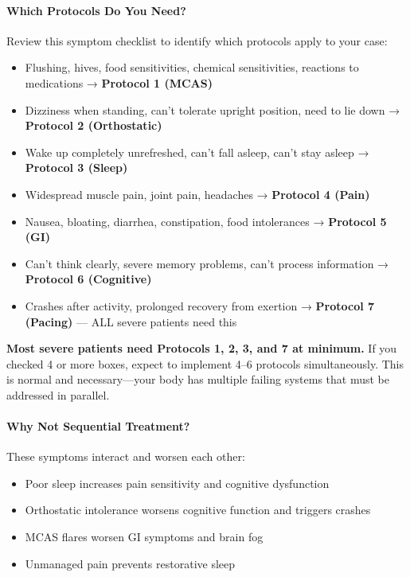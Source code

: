 \paragraph{Which Protocols Do You Need?}

Review this symptom checklist to identify which protocols apply to your case:

\begin{itemize}
    \item[$\square$] Flushing, hives, food sensitivities, chemical sensitivities, reactions to medications → \textbf{Protocol 1 (MCAS)}
    \item[$\square$] Dizziness when standing, can't tolerate upright position, need to lie down → \textbf{Protocol 2 (Orthostatic)}
    \item[$\square$] Wake up completely unrefreshed, can't fall asleep, can't stay asleep → \textbf{Protocol 3 (Sleep)}
    \item[$\square$] Widespread muscle pain, joint pain, headaches → \textbf{Protocol 4 (Pain)}
    \item[$\square$] Nausea, bloating, diarrhea, constipation, food intolerances → \textbf{Protocol 5 (GI)}
    \item[$\square$] Can't think clearly, severe memory problems, can't process information → \textbf{Protocol 6 (Cognitive)}
    \item[$\square$] Crashes after activity, prolonged recovery from exertion → \textbf{Protocol 7 (Pacing)} — ALL severe patients need this
\end{itemize}

\textbf{Most severe patients need Protocols 1, 2, 3, and 7 at minimum.} If you checked 4 or more boxes, expect to implement 4--6 protocols simultaneously. This is normal and necessary—your body has multiple failing systems that must be addressed in parallel.

\paragraph{Why Not Sequential Treatment?}

These symptoms interact and worsen each other:
\begin{itemize}
    \item Poor sleep increases pain sensitivity and cognitive dysfunction
    \item Orthostatic intolerance worsens cognitive function and triggers crashes
    \item MCAS flares worsen GI symptoms and brain fog
    \item Unmanaged pain prevents restorative sleep
\end{itemize}

